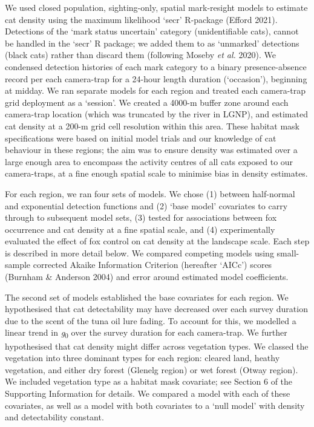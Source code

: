 \documentclass[]{elsarticle} %
\begin{document}
We used closed population, sighting-only, spatial mark-resight models to estimate cat density using the maximum likelihood `secr' R-package (Efford 2021). Detections of the `mark status uncertain' category (unidentifiable cats), cannot be handled in the `secr' R package; we added them to as `unmarked' detections (black cats) rather than discard them (following Moseby \emph{et al.} 2020). We condensed detection histories of each mark category to a binary presence-absence record per each camera-trap for a 24-hour length duration (`occasion'), beginning at midday. We ran separate models for each region and treated each camera-trap grid deployment as a `session'. We created a 4000-m buffer zone around each camera-trap location (which was truncated by the river in LGNP), and estimated cat density at a 200-m grid cell resolution within this area. These habitat mask specifications were based on initial model trials and our knowledge of cat behaviour in these regions; the aim was to ensure density was estimated over a large enough area to encompass the activity centres of all cats exposed to our camera-traps, at a fine enough spatial scale to minimise bias in density estimates.

For each region, we ran four sets of models. We chose (1) between half-normal and exponential detection functions and (2) `base model' covariates to carry through to subsequent model sets, (3) tested for associations between fox occurrence and cat density at a fine spatial scale, and (4) experimentally evaluated the effect of fox control on cat density at the landscape scale. Each step is described in more detail below. We compared competing models using small-sample corrected Akaike Information Criterion (hereafter `AICc') scores (Burnham \& Anderson 2004) and error around estimated model coefficients.

The second set of models established the base covariates for each region. We hypothesised that cat detectability may have decreased over each survey duration due to the scent of the tuna oil lure fading. To account for this, we modelled a linear trend in \emph{g}\textsubscript{0} over the survey duration for each camera-trap. We further hypothesised that cat density might differ across vegetation types. We classed the vegetation into three dominant types for each region: cleared land, heathy vegetation, and either dry forest (Glenelg region) or wet forest (Otway region). We included vegetation type as a habitat mask covariate; see Section 6 of the Supporting Information for details. We compared a model with each of these covariates, as well as a model with both covariates to a `null model' with density and detectability constant.
\end{document}
